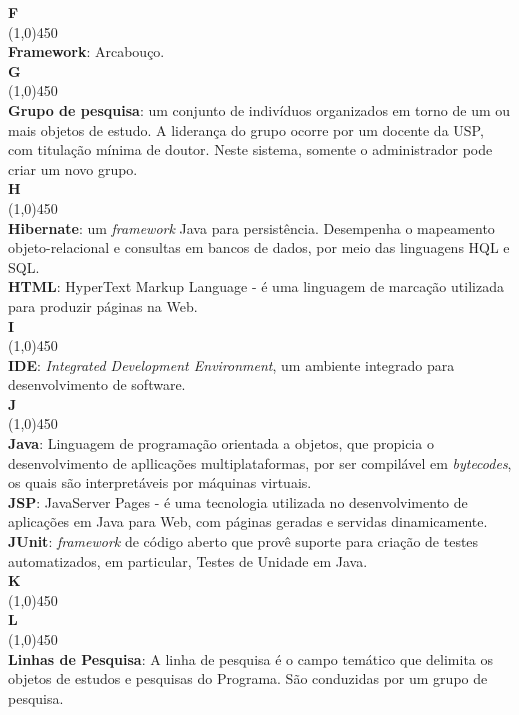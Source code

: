 \documentclass[11pt, a4paper]{article}
\begin{document}
	\noindent\textbf{\huge{F}}\\
	\line(1,0){450}\\
	\textbf{Framework}: Arcabouço.\\

	\noindent\textbf{\huge{G}}\\
	\line(1,0){450}\\
	\textbf{Grupo de pesquisa}: um conjunto de indivíduos organizados em torno de um ou mais objetos de estudo. A liderança do grupo ocorre por um docente da USP, com titulação mínima de doutor. Neste sistema, somente o administrador pode criar um novo grupo.\\
	
	\noindent\textbf{\huge{H}}\\
	\line(1,0){450}\\
	\textbf{Hibernate}: um \emph{framework} Java para persistência. Desempenha o mapeamento objeto-relacional e consultas em bancos de dados, por meio das linguagens HQL e SQL.\\
	\textbf{HTML}: HyperText Markup Language - é uma linguagem de marcação 
	utilizada para produzir páginas na Web.\\
	
	\noindent\textbf{\huge{I}}\\
	\line(1,0){450}\\
	\textbf{IDE}: \emph{Integrated Development Environment}, um ambiente integrado 
	para desenvolvimento de software.\\
	
	\noindent\textbf{\huge{J}}\\
	\line(1,0){450}\\
	\textbf{Java}: Linguagem de programação orientada a objetos, que propicia o desenvolvimento de apllicações multiplataformas, por ser compilável em \emph{bytecodes}, os quais são interpretáveis por máquinas virtuais.\\
	\textbf{JSP}: JavaServer Pages - é uma tecnologia utilizada no 
	desenvolvimento de aplicações em Java para Web, com páginas geradas e servidas dinamicamente.\\
	\textbf{JUnit}: \emph{framework} de código aberto que provê suporte para criação de testes automatizados, em particular, Testes de Unidade em Java.\\
	
	\noindent\textbf{\huge{K}}\\
	\line(1,0){450}\\
		
	\noindent\textbf{\huge{L}}\\
	\line(1,0){450}\\
	\textbf{Linhas de Pesquisa}: A linha de pesquisa é o campo temático que delimita os objetos de estudos e pesquisas do Programa. São conduzidas por um grupo de pesquisa.\\
		
\end{document}
